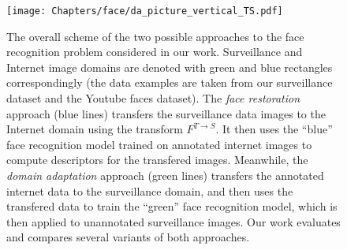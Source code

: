 




%
 \begin{figure}
 \centering
    \texttt{[image: Chapters/face/da\_picture\_vertical\_TS.pdf]}
    \caption{The overall scheme of the two possible approaches to the face recognition problem considered in our work. Surveillance and Internet image domains are denoted with green and blue rectangles correspondingly (the data examples are taken from our surveillance dataset and the Youtube faces dataset).
    The \textit{face restoration} approach (blue lines) transfers the surveillance data images to the Internet domain using the transform $F^{T \rightarrow S}$. It then uses the ``blue'' face recognition model trained on annotated internet images to compute descriptors for the transfered images. Meanwhile, the \textit{domain adaptation} approach (green lines) transfers the annotated internet data to the surveillance domain, and then uses the transfered data to train the ``green'' face recognition model, which is then applied to unannotated surveillance images. Our work evaluates and compares several variants of both approaches.}
  \end{figure}

